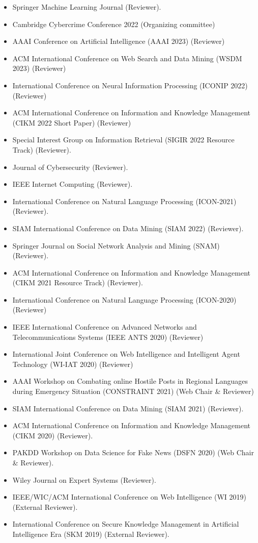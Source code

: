 \documentclass[margin, centered,lmodern]{res}
\begin{document}
\begin{resume}
\begin{itemize}[leftmargin=*]
\item Springer Machine Learning Journal (Reviewer).
\item Cambridge Cybercrime Conference 2022 (Organizing committee)
\item AAAI Conference on Artificial Intelligence (AAAI 2023) (Reviewer)
\item ACM International Conference on Web Search and Data Mining (WSDM 2023) (Reviewer)
\item International Conference on Neural Information Processing (ICONIP 2022) (Reviewer)
\item ACM International Conference on Information and Knowledge Management (CIKM 2022 Short Paper) (Reviewer)
\item Special Interest Group on Information Retrieval (SIGIR 2022 Resource Track) (Reviewer).
\item Journal of Cybersecurity (Reviewer).
\item IEEE Internet Computing (Reviewer).
\item International Conference on Natural Language Processing (ICON-2021) (Reviewer).
\item SIAM International Conference on Data Mining (SIAM 2022) (Reviewer).
\item Springer Journal on Social Network Analysis and Mining (SNAM)   (Reviewer).
   \item ACM International Conference on Information and Knowledge Management (CIKM 2021 Resource Track) (Reviewer).
    \item International Conference on Natural Language Processing (ICON-2020) (Reviewer)
    \item IEEE International Conference on Advanced Networks and Telecommunications Systems (IEEE ANTS 2020) (Reviewer)
    \item International Joint Conference on Web Intelligence and Intelligent Agent Technology (WI-IAT 2020) (Reviewer)
	\item AAAI Workshop on Combating online Hostile Posts in Regional Languages during Emergency Situation (CONSTRAINT 2021) (Web Chair \& Reviewer)
	\item SIAM International Conference on Data Mining (SIAM 2021) (Reviewer).
	\item ACM International Conference on Information and Knowledge Management (CIKM 2020) (Reviewer).
	\item PAKDD Workshop on Data Science for Fake News (DSFN 2020) (Web Chair \& Reviewer).
	\item Wiley Journal on Expert Systems (Reviewer).
	\item IEEE/WIC/ACM International Conference on Web Intelligence (WI 2019) (External Reviewer).
	\item International Conference on Secure Knowledge Management in Artificial Intelligence Era (SKM 2019) (External Reviewer).
\end{itemize}


\end{resume}
\end{document}
